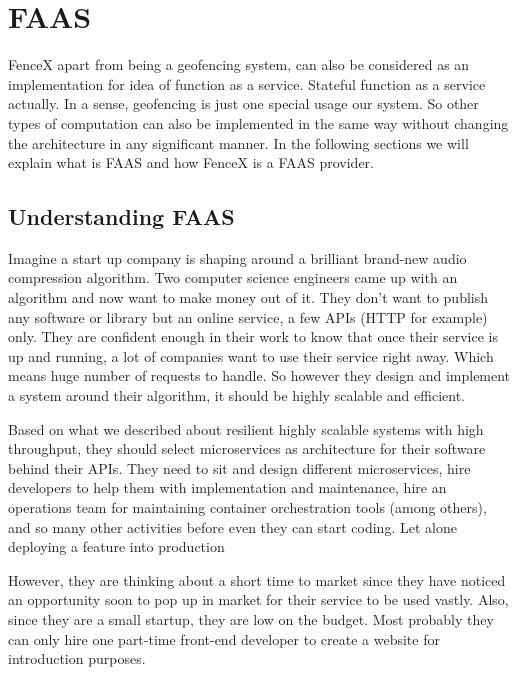 \documentclass[a4]{report}
\begin{document}
    \chapter{FAAS}
    FenceX apart from being a geofencing system, can also be considered as an implementation for idea of function as a service.
    Stateful function as a service actually.
    In a sense, geofencing is just one special usage our system.
    So other types of computation can also be implemented in the same way without changing the architecture in any
    significant manner.
    In the following sections we will explain what is FAAS and how FenceX is a FAAS provider.


    \section{Understanding FAAS}
    Imagine a start up company is shaping around a brilliant brand-new audio compression algorithm.
    Two computer science engineers came up with an algorithm and now want to make money out of it.
    They don't want to publish any software or library but an online service, a few APIs (HTTP for example) only.
    They are confident enough in their work to know that once their service is up and running, a lot of companies
    want to use their service right away.
    Which means huge number of requests to handle.
    So however they design and implement a system around their algorithm, it should be highly scalable and efficient.

    Based on what we described about resilient highly scalable systems with high throughput, they should select
    microservices as architecture for their software behind their APIs.
    They need to sit and design different microservices, hire developers to help them with implementation and
    maintenance, hire an operations team for maintaining container orchestration tools (among others), and so many
    other activities before even they can start coding.
    Let alone deploying a feature into production

    However, they are thinking about a short time to market since they have noticed an opportunity soon to pop up in
    market for their service to be used vastly.
    Also, since they are a small startup, they are low on the budget.
    Most probably they can only hire one part-time front-end developer to create a website for introduction
    purposes.
\end{document}
